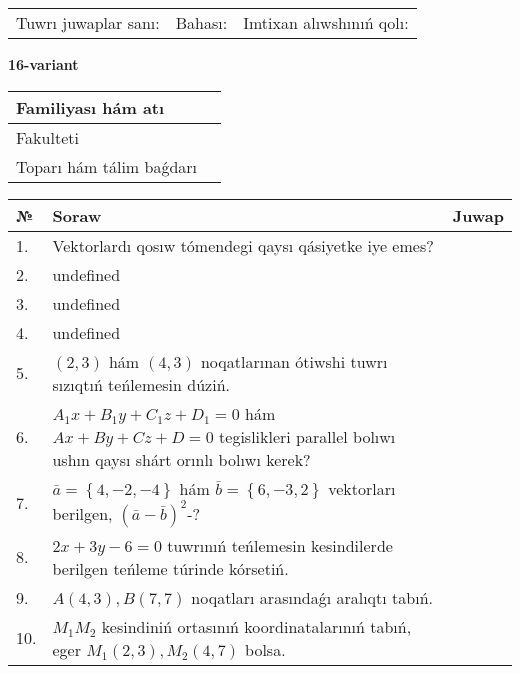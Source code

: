 \documentclass{article}
\begin{document}
\vspace{0.7cm}

\begin{tabular}{lll}
Tuwrı juwaplar sanı: \underline{\hspace{1cm}} & 
Bahası: \underline{\hspace{1cm}} & 
Imtixan alıwshınıń qolı: \underline{\hspace{2cm}} \\
\end{tabular}

\egroup

\newpage


\textbf{16-variant}\\

\bgroup
\def\arraystretch{1.6} %

\begin{tabular}{|m{5.7cm}|m{9.5cm}|}
\hline
Familiyası hám atı & \\
\hline
Fakulteti  & \\
\hline
Toparı hám tálim baǵdarı  & \\
\hline
\end{tabular}

\vspace{0.7cm}

\begin{tabular}{|m{0.7cm}|m{10cm}|m{4cm}|}
\hline
№ & Soraw & Juwap \\
\hline
1. & Vektorlardı qosıw tómendegi qaysı qásiyetke iye emes? &  \\
\hline
2. & undefined &  \\
\hline
3. & undefined &  \\
\hline
4. & undefined &  \\
\hline
5. & $(2, 3)$ hám $(4, 3)$ noqatlarınan ótiwshi tuwrı sızıqtıń teńlemesin dúziń. &  \\
\hline
6. & \(A_{1}x + B_{1}y + C_{1}z + D_{1} = 0\) hám \(Ax + By + Cz + D = 0\) tegislikleri parallel bolıwı ushın qaysı shárt orınlı bolıwı kerek? &  \\
\hline
7. & \(\bar{a} = \left\{ 4,- 2,- 4 \right\}\) hám \(\bar{b} = \left\{ 6,- 3, 2 \right\}\) vektorları berilgen, \((\bar{a} - \bar{b}) ^{2}\)-? &  \\
\hline
8. & \(2 x + 3 y - 6 = 0\) tuwrınıń teńlemesin kesindilerde berilgen teńleme túrinde kórsetiń. &  \\
\hline
9. & \(A (4, 3), B (7, 7)\) noqatları arasındaǵı aralıqtı tabıń. &  \\
\hline
10. & \(M_{1}M_{2}\) kesindiniń ortasınıń koordinatalarınıń tabıń, eger \(M_{1} (2, 3), M_{2} (4, 7)\) bolsa. & \\
\hline
\end{tabular}
\end{document}
